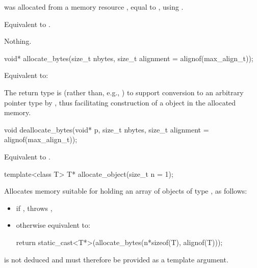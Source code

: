 \begin{itemdescr}
\pnum
\expects
{} was allocated from a memory resource ,
equal to ,
using .

\pnum
\effects
Equivalent to .

\pnum
\throws
Nothing.
\end{itemdescr}

%
\begin{itemdecl}
void* allocate_bytes(size_t nbytes, size_t alignment = alignof(max_align_t));
\end{itemdecl}

\begin{itemdescr}
\pnum
\effects
Equivalent to: 

\pnum
\begin{note}
The return type is  (rather than, e.g., )
to support conversion to an arbitrary pointer type 
by , thus facilitating construction of a 
object in the allocated memory.
\end{note}
\end{itemdescr}

%
\begin{itemdecl}
void deallocate_bytes(void* p, size_t nbytes, size_t alignment = alignof(max_align_t));
\end{itemdecl}

\begin{itemdescr}
\pnum
\effects
Equivalent to .
\end{itemdescr}

%
\begin{itemdecl}
template<class T>
  T* allocate_object(size_t n = 1);
\end{itemdecl}

\begin{itemdescr}
\pnum
\effects
Allocates memory suitable for holding
an array of  objects of type , as follows:
\begin{itemize}
\item
  if ,
  throws ,
\item
  otherwise equivalent to:
\begin{codeblock}
return static_cast<T*>(allocate_bytes(n*sizeof(T), alignof(T)));
\end{codeblock}
\end{itemize}

\pnum
\begin{note}
 is not deduced and must therefore be provided as a template argument.
\end{note}
\end{itemdescr}

